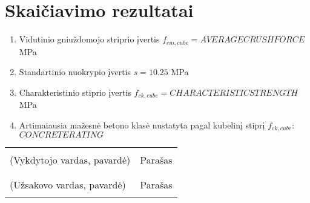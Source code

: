 \documentclass[a4paper, 12pt]{article}
\begin{document}
\section{Skaičiavimo rezultatai}
\begin{enumerate}
	\item \hspace{\parindent}Vidutinio gniuždomojo striprio įvertis $ f_{cm,cube} =  {{AVERAGECRUSHFORCE}} $ MPa %
	      
	\item Standartinio nuokrypio įvertis $ s = 10.25 $ MPa %
	      
	\item  Charakteristinio stiprio įvertis $ f_{ck,cube} = {{CHARACTERISTICSTRENGTH}} $ MPa %
	      
	\item Artimaiausia mažesnė betono klasė nustatyta pagal kubelinį stiprį $f_{ck,cube}$: $ {{CONCRETERATING}} $
\end{enumerate}

\noindent\begin{tabular}{@{}>{\centering}p{2.5in}>{\centering}p{2.5in}@{}}
	\dotfill                         & \dotfill \tabularnewline
	(Vykdytojo vardas, pavardė)              &  Parašas \tabularnewline
  
									 &  \tabularnewline
									 \dotfill                         & \dotfill \tabularnewline
	(Užsakovo vardas, pavardė)              &  Parašas \tabularnewline
  
									 &  \tabularnewline
	\end{tabular} 
\end{document}
